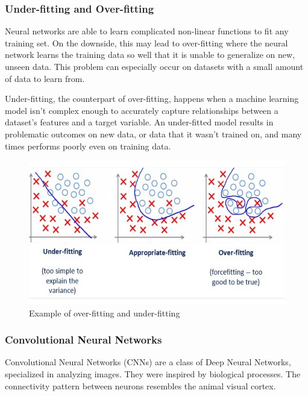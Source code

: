 \clearpage
\subsubsection{Under-fitting and Over-fitting}

Neural networks are able to learn complicated non-linear functions to fit any training set. On the downside, this may lead to over-fitting where the neural network learns the training data so well that it is unable to generalize on new, unseen data. This problem can especially occur on datasets with a small amount of data to learn from. \par

Under-fitting, the counterpart of over-fitting, happens when a machine learning model isn’t complex enough to accurately capture relationships between a dataset’s features and a target variable. An under-fitted model results in problematic outcomes on new data, or data that it wasn’t trained on, and many times performs poorly even on training data. \par


\begin{figure}[h]
	\caption[Example of over-fitting and under-fitting]{Example of over-fitting and under-fitting \cite{vitaflux}}
	\centering
	\includegraphics[width=1\textwidth, height=\textheight, keepaspectratio]{"resources/overfitting"}
\end{figure}

\subsubsection{Convolutional Neural Networks}
\par
Convolutional Neural Networks (CNNs) are a class of Deep Neural Networks,
specialized in analyzing images. They were inspired by biological processes.
The connectivity pattern between neurons resembles the animal visual cortex.
\cite{cnn} \par

